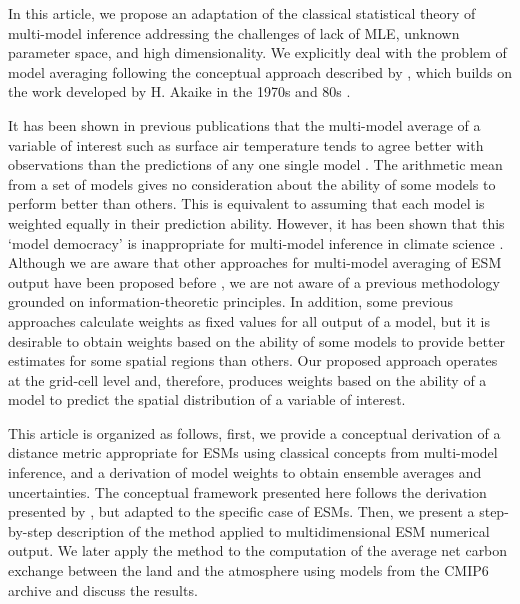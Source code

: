 \documentclass[gmd, manuscript]{copernicus}
\begin{document}
In this article, we propose an adaptation of the classical statistical theory of multi-model inference addressing the challenges of lack of MLE, unknown parameter space, and high dimensionality. We explicitly deal with the problem of model averaging following the conceptual approach described by \citet{Burnham2002}, which builds on the work developed by H. Akaike in the 1970s and 80s \citep{Parzen1998}.

It has been shown in previous publications that the multi-model average of a variable of interest such as surface air temperature tends to agree better with observations than the predictions of any one single model \citep{Doblas-Reyes2003, Hagedorn2005, Elvidge2023}. The arithmetic mean from a set of models gives no consideration about the ability of some models to perform better than others. This is equivalent to assuming that each model is weighted equally in their prediction ability. However, it has been shown that this `model democracy' is inappropriate for multi-model inference in climate science \citep{Knutti2010CC, Knutti2017}. Although we are aware that other approaches for multi-model averaging of ESM output have been proposed before \citep[e.g.,][]{Knutti2017, Ribes2021, Sanderson2015, Giorgi2002, Tebaldi2007, Tebaldi2005, Elvidge2023}, we are not aware of a previous methodology grounded on information-theoretic principles. In addition, some previous approaches calculate weights as fixed values for all output of a model, but it is desirable to obtain weights based on the ability of some models to provide better estimates for some spatial regions than others. Our proposed approach operates at the grid-cell level and, therefore, produces weights based on the ability of a model to predict the spatial distribution of a variable of interest.

This article is organized as follows, first, we provide a conceptual derivation of a distance metric appropriate for ESMs using classical concepts from multi-model inference, and a derivation of model weights to obtain ensemble averages and uncertainties. The conceptual framework presented here follows the derivation presented by \citet{Burnham2002}, but adapted to the specific case of ESMs. Then, we present a step-by-step description of the method applied to multidimensional ESM numerical output. We later apply the method to the computation of the average net carbon exchange between the land and the atmosphere using models from the CMIP6 archive and discuss the results. 
\end{document}
